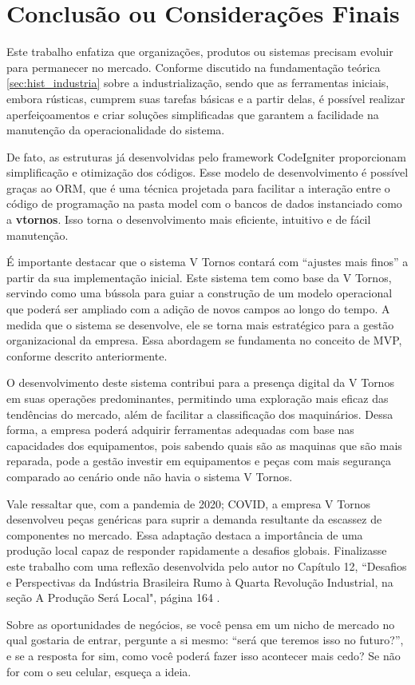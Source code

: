 \chapter{Conclusão ou Considerações Finais}

Este trabalho enfatiza que organizações, produtos ou sistemas precisam evoluir para permanecer no mercado. Conforme discutido na fundamentação teórica \ref{sec:hist_industria} sobre a industrialização, sendo que as ferramentas iniciais, embora rústicas, cumprem suas tarefas básicas e a partir delas, é possível realizar aperfeiçoamentos e criar soluções simplificadas que garantem a facilidade na manutenção da operacionalidade do sistema.

De fato, as estruturas já desenvolvidas pelo framework CodeIgniter proporcionam simplificação e otimização dos códigos. Esse modelo de desenvolvimento é possível graças ao ORM, que é uma técnica projetada para facilitar a interação entre o código de programação na pasta model com o bancos de dados instanciado como a \textbf{vtornos}. Isso torna o desenvolvimento mais eficiente, intuitivo e de fácil manutenção.

É importante destacar que o sistema V Tornos contará com ``ajustes mais finos'' a partir da sua implementação inicial. Este sistema tem como base da V Tornos, servindo como uma bússola para guiar a construção de um modelo operacional que poderá ser ampliado com a adição de novos campos ao longo do tempo. A medida que o sistema se desenvolve, ele se torna mais estratégico para a gestão organizacional da empresa. Essa abordagem se fundamenta no conceito de MVP, conforme descrito anteriormente.

O desenvolvimento deste sistema contribui para a presença digital da V Tornos em suas operações predominantes, permitindo uma exploração mais eficaz das tendências do mercado, além de facilitar a classificação dos maquinários. Dessa forma, a empresa poderá adquirir ferramentas adequadas com base nas capacidades dos equipamentos, pois sabendo quais são as maquinas que são mais reparada, pode a gestão investir em equipamentos e peças com mais segurança comparado ao cenário onde não havia o sistema V Tornos.

Vale ressaltar que, com a pandemia de 2020; COVID, a empresa V Tornos desenvolveu peças genéricas para suprir a demanda resultante da escassez de componentes no mercado. Essa adaptação destaca a importância de uma produção local capaz de responder rapidamente a desafios globais. Finalizasse este trabalho com uma reflexão desenvolvida pelo autor no Capítulo 12, ``Desafios e Perspectivas da Indústria Brasileira Rumo à Quarta Revolução Industrial, na seção A Produção Será Local", página 164 \cite{b:industria_v4_2018}. 

\begin{citacao}
Sobre as oportunidades de negócios, se você pensa em um nicho de mercado no qual gostaria de entrar, pergunte a si mesmo: “será que teremos isso no futuro?”, e se a resposta for sim, como você poderá fazer isso acontecer mais cedo? Se não for com o seu celular, esqueça a ideia. 
\end{citacao}